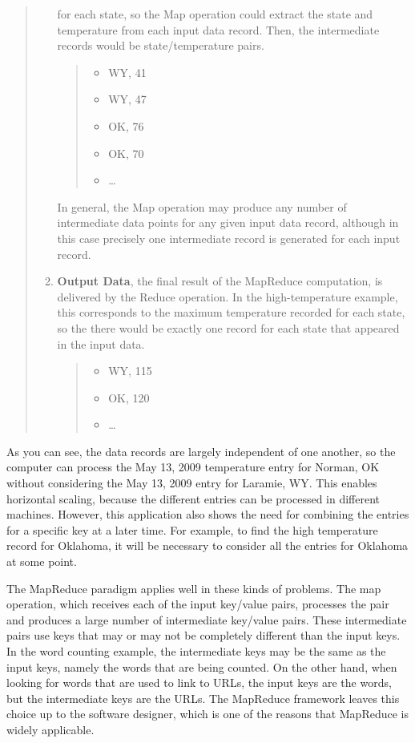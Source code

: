 \begin{quote}
\begin{enumerate}
        for each state, so the Map operation could extract
        the state and temperature from each input data record.
        Then, the intermediate records would be state/temperature pairs.
        \begin {quote}
        \begin{itemize}
            \item \textsf{WY, 41}
            \item \textsf{WY, 47}
            \item \textsf{OK, 76}
            \item \textsf{OK, 70}
            \item \dots
        \end{itemize}
        \end{quote}
        In general, the Map operation may produce any number of intermediate
        data points for any given input data record, although in this case
        precisely one intermediate record is generated for each input record.
    \item \textbf{Output Data}, the final result of the MapReduce computation,
        is delivered by the Reduce operation. 
        In the high-temperature example, this
        corresponds to the maximum temperature recorded for each state, so the
        there would be exactly one record for each state that appeared in the input data.
        \begin {quote}
        \begin{itemize}
            \item \textsf{WY, 115}
            \item \textsf{OK, 120}
            \item \dots
        \end{itemize}
        \end{quote}
\end{enumerate}
\end{quote}
As you can see, the data records are largely independent of one another, so the computer
can process the May 13, 2009 temperature entry for Norman, OK without considering the
May 13, 2009 entry for Laramie, WY.  This enables horizontal scaling, because the
different entries can be processed in different machines.
However, this application also shows the need for combining
the entries for a specific key at a later time.  For example,
to find the high temperature record for Oklahoma, it will be
necessary to consider all the entries for Oklahoma at some
point.

The MapReduce paradigm applies well in these kinds of problems.
The \textsf{map} operation, which receives each
of the input key/value pairs, processes the
pair and produces a large number of intermediate
key/value pairs.  These intermediate pairs use keys that may
or may not be completely different than the input keys.
In the word counting example, the intermediate keys may be the same
as the input keys, namely the words that are being counted.
On the other hand, when looking for words that are used to
link to URLs, the input keys are the words, but the
intermediate keys are the URLs. The MapReduce framework leaves
this choice up to the software designer, which is
one of the reasons that MapReduce is widely applicable.

